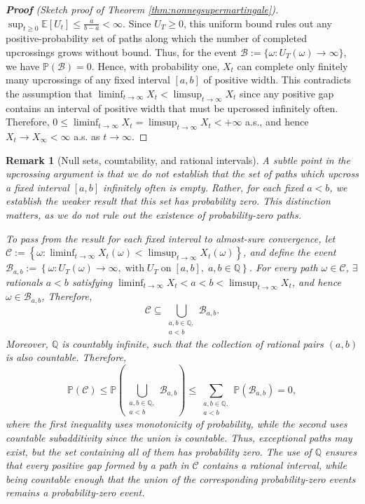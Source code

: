 \documentclass[12pt]{article}
\newtheorem{remark}{Remark}
\begin{document}
\begin{proof}[\textbf{Proof} (Sketch proof of Theorem \ref{thm:nonnegsupermartingale})]
$\sup_{t\geq0}\mathbb{E}[U_t]\leq \frac{a}{b-a} < \infty$.
Since $U_T\geq0$, this uniform bound rules out any positive-probability set of paths 
along which the number of completed upcrossings grows without bound. Thus, for the event
$\mathcal{B}:=\{\omega:U_T(\omega)\to\infty\}$, we have $\mathbb{P}(\mathcal{B})=0$.
Hence, with probability one, $X_t$ can complete only finitely many upcrossings of any 
fixed interval $[a,b]$ of positive width. This contradicts the assumption 
that $\liminf_{t\to\infty}X_t<\limsup_{t\to\infty}X_t$ since any positive gap contains 
an interval of positive width that must be upcrossed infinitely often. Therefore,
$0\leq\liminf_{t\to\infty}X_t=\limsup_{t\to\infty}X_t<+\infty$ a.s., and hence 
$X_{t}\to X_{\infty}<\infty$ a.s. as $t\to\infty$. 
\end{proof}

\begin{remark}[Null sets, countability, and rational intervals]
A subtle point in the upcrossing argument is that we do not establish that the set of paths
which upcross a fixed interval $[a,b]$ infinitely often is empty. Rather, for each
fixed $a<b$, we establish the weaker result that this set has probability zero.
This distinction matters, as we do not rule out the existence of probability-zero paths.

To pass from the result for each fixed interval to almost-sure convergence, let
$\mathcal{C}:=\left\{\omega:\liminf_{t\to\infty}X_t(\omega) <\limsup_{t\to\infty}X_t(\omega)\right\}$, 
and define the event 
$\mathcal{B}_{a,b}:=\left\{\omega:U_T(\omega)\to\infty, \; \text{with} \; U_T \;\text{on}\; [a,b], \; a,b\in\mathbb{Q} \right\}$.
For every path $\omega\in \mathcal{C}$, $\exists$ rationals $a<b$ satisfying 
$\liminf_{t\to\infty}X_t<a<b<\limsup_{t\to\infty}X_t$, and hence $\omega\in\mathcal{B}_{a,b}$,
Therefore,
\[
\mathcal{C}\subseteq
\bigcup_{\substack{a,b\in\mathbb{Q},\\a<b}}\mathcal{B}_{a,b}.
\]
Moreover, $\mathbb{Q}$ is countably infinite, such that the collection of rational pairs $(a,b)$ is also countable. 
Therefore,
\[
\mathbb{P}(\mathcal{C}) 
\leq \mathbb{P}\left(\bigcup_{\substack{a,b\in\mathbb{Q},\\a<b}}\mathcal{B}_{a,b}\right)
\leq\sum_{\substack{a,b\in\mathbb{Q},\\a<b}}\mathbb{P}(\mathcal{B}_{a,b})=0,
\]
where the first inequality uses monotonicity of probability, while the second uses
countable subadditivity since the union is countable. 
Thus, exceptional paths may exist, but the set containing all of them has probability zero.
The use of $\mathbb{Q}$ ensures that every positive gap formed by a path in $\mathcal{C}$ 
contains a rational interval, while being countable enough that the union of the corresponding 
probability-zero events remains a probability-zero event.
\end{remark}
\end{document}
